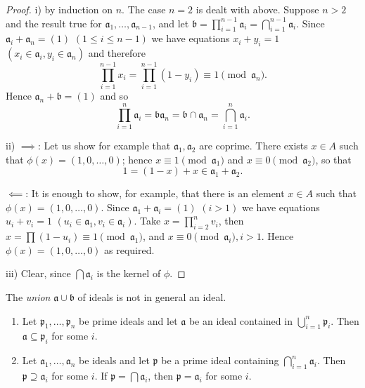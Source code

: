 \begin{proof}
i) by induction on $n$. The case $n = 2$ is dealt with above. Suppose $n > 2$ and the result true for $\mathfrak{a}_1, \ldots, \mathfrak{a}_{n-1}$, and let $\mathfrak{b} = \prod_{i=1}^{n-1} \mathfrak{a}_i = \bigcap_{i=1}^{n-1} \mathfrak{a}_i$. Since $\mathfrak{a}_i + \mathfrak{a}_n = (1)$ $(1 \le i \le n-1)$ we have equations $x_i + y_i = 1$ $(x_i \in \mathfrak{a}_i, y_i \in \mathfrak{a}_n)$ and therefore
\[
\prod_{i=1}^{n-1} x_i = \prod_{i=1}^{n-1} (1 - y_i) \equiv 1 \pmod{\mathfrak{a}_n}.
\]
Hence $\mathfrak{a}_n + \mathfrak{b} = (1)$ and so
\[
\prod_{i=1}^{n} \mathfrak{a}_i = \mathfrak{b}\mathfrak{a}_n = \mathfrak{b} \cap \mathfrak{a}_n = \bigcap_{i=1}^{n} \mathfrak{a}_i.
\]

ii) $\implies$: Let us show for example that $\mathfrak{a}_1, \mathfrak{a}_2$ are coprime. There exists $x \in A$ such that $\phi(x) = (1, 0, \ldots, 0)$; hence $x \equiv 1 \pmod{\mathfrak{a}_1}$ and $x \equiv 0 \pmod{\mathfrak{a}_2}$, so that
\[
1 = (1 - x) + x \in \mathfrak{a}_1 + \mathfrak{a}_2.
\]

$\impliedby$: It is enough to show, for example, that there is an element $x \in A$ such that $\phi(x) = (1, 0, \ldots, 0)$. Since $\mathfrak{a}_1 + \mathfrak{a}_i = (1)$ $(i > 1)$ we have equations $u_i + v_i = 1$ $(u_i \in \mathfrak{a}_1, v_i \in \mathfrak{a}_i)$. Take $x = \prod_{i=2}^{n} v_i$, then $x = \prod (1 - u_i) \equiv 1 \pmod{\mathfrak{a}_1}$, and $x \equiv 0 \pmod{\mathfrak{a}_i}, i > 1$. Hence $\phi(x) = (1, 0, \ldots, 0)$ as required.

iii) Clear, since $\bigcap \mathfrak{a}_i$ is the kernel of $\phi$.
\end{proof}

The \emph{union} $\mathfrak{a} \cup \mathfrak{b}$ of ideals is not in general an ideal.

\begin{proposition}\label{pro:prime avoidance}
\begin{enumerate}
    \item[i)] Let $\mathfrak{p}_1, \ldots, \mathfrak{p}_n$ be prime ideals and let $\mathfrak{a}$ be an ideal contained in $\bigcup_{i=1}^{n} \mathfrak{p}_i$. Then $\mathfrak{a} \subseteq \mathfrak{p}_i$ for some $i$.
    \item[ii)] Let $\mathfrak{a}_1, \ldots, \mathfrak{a}_n$ be ideals and let $\mathfrak{p}$ be a prime ideal containing $\bigcap_{i=1}^{n} \mathfrak{a}_i$. Then $\mathfrak{p} \supseteq \mathfrak{a}_i$ for some $i$. If $\mathfrak{p} = \bigcap \mathfrak{a}_i$, then $\mathfrak{p} = \mathfrak{a}_i$ for some $i$.
\end{enumerate}
\end{proposition}

